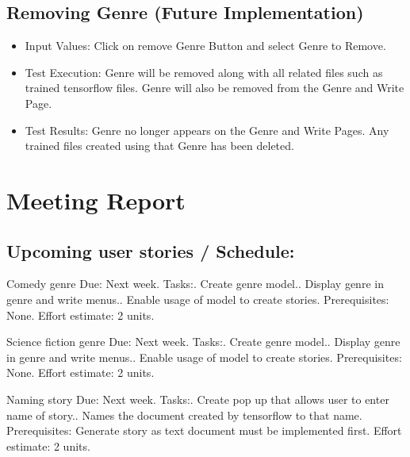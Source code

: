 \documentclass[12pt]{article}
\begin{document}
\subsection{Removing Genre (Future Implementation)}

\begin{itemize}
\item Input Values: Click on remove Genre Button and select Genre to Remove.
\item Test Execution: Genre will be removed along with all related files such as trained tensorflow files. Genre will also be removed from the Genre and Write Page.
\item Test Results: Genre no longer appears on the Genre and Write Pages. Any trained files created using that Genre has been deleted.
\end{itemize}

\section{Meeting Report }

\subsection{Upcoming user stories / Schedule:}
Comedy genre\newline
Due: Next week.\newline
Tasks:. Create genre model.. Display genre in genre and write menus.. Enable usage of model to create stories.\newline
Prerequisites: None.\newline
Effort estimate: 2 units.\newline

Science fiction genre\newline
Due: Next week.\newline
Tasks:. Create genre model.. Display genre in genre and write menus.. Enable usage of model to create stories.\newline
Prerequisites: None.\newline
Effort estimate: 2 units.\newline

Naming story\newline
Due: Next week.\newline
Tasks:. Create pop up that allows user to enter name of story.. Names the document created by tensorflow to that name.\newline
Prerequisites:\newline
Generate story as text document must be implemented first.\newline
Effort estimate: 2 units.\newline
\end{document}

